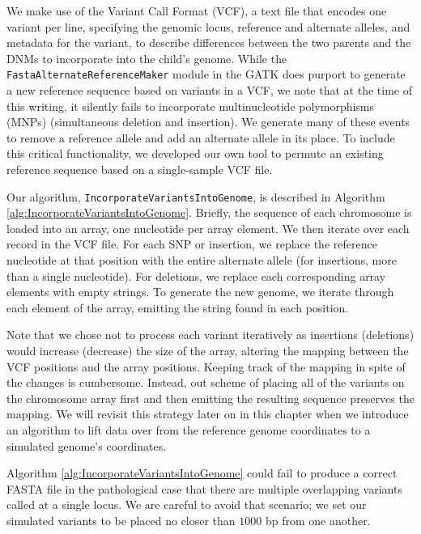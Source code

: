 We make use of the Variant Call Format (VCF)\cite{Danecek:2011gz}, a text file that encodes one variant per line, specifying the genomic locus, reference and alternate alleles, and metadata for the variant, to describe differences between the two parents and the DNMs to incorporate into the child's genome.  While the \texttt{FastaAlternateReferenceMaker} module in the GATK does purport to generate a new reference sequence based on variants in a VCF, we note that at the time of this writing, it silently fails to incorporate multinucleotide polymorphisms (MNPs) (simultaneous deletion and insertion).  We generate many of these events to remove a reference allele and add an alternate allele in its place.  To include this critical functionality, we developed our own tool to permute an existing reference sequence based on a single-sample VCF file.

Our algorithm, \texttt{IncorporateVariantsIntoGenome}, is described in Algorithm \ref{alg:IncorporateVariantsIntoGenome}.  Briefly, the sequence of each chromosome is loaded into an array, one nucleotide per array element.  We then iterate over each record in the VCF file.  For each SNP or insertion, we replace the reference nucleotide at that position with the entire alternate allele (for insertions, more than a single nucleotide).  For deletions, we replace each corresponding array elements with empty strings.  To generate the new genome, we iterate through each element of the array, emitting the string found in each position.

Note that we chose not to process each variant iteratively as insertions (deletions) would increase (decrease) the size of the array, altering the mapping between the VCF positions and the array positions.  Keeping track of the mapping in spite of the changes is cumbersome.  Instead, out scheme of placing all of the variants on the chromosome array first and then emitting the resulting sequence preserves the mapping.  We will revisit this strategy later on in this chapter when we introduce an algorithm to lift data over from the reference genome coordinates to a simulated genome's coordinates.

Algorithm \ref{alg:IncorporateVariantsIntoGenome} could fail to produce a correct FASTA file in the pathological case that there are multiple overlapping variants called at a single locus.  We are careful to avoid that scenario; we set our simulated variants to be placed no closer than $1000$ bp from one another.

